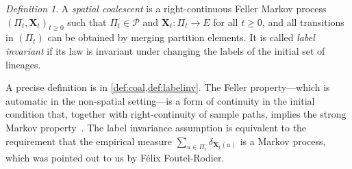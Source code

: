 \documentclass[reqno,draft]{amsart}
\numberwithin{equation}{section}
\theoremstyle{plain}
\theoremstyle{remark}
\newtheorem{definition}[theorem]{Definition}
\newcommand{\fpart}{\Pi} %
\begin{document}
\begin{definition}\label{def:coalintro}
    A \emph{spatial coalescent} is a right-continuous Feller Markov process $(\fpart_t,\boldsymbol X_t)_{t \ge 0}$ such that $\fpart_t \in \mathcal{P}$ and $\boldsymbol X_t \colon \fpart_t \to E$ for all $t \ge 0$, and all transitions in $(\fpart_t)$ can be obtained by merging partition elements. It is called \emph{label invariant} if its law is invariant under changing the labels of the initial set of lineages.
\end{definition}
A precise definition is in \cref{def:coal,def:labelinv}. The Feller property---which is automatic in the non-spatial setting---is a form of continuity in the initial condition that, together with right-continuity of sample paths, implies the strong Markov property~\cite[Thm.\ 8.3]{rogers}. The label invariance assumption is equivalent to the requirement that the empirical measure $\sum_{u\in \fpart_t} \delta_{\boldsymbol X_t(u)}$ is a Markov process, which was pointed out to us by F\'elix Foutel-Rodier.


\end{document}
